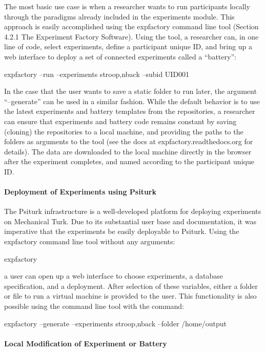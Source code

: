 \documentclass{report}
\begin{document}
The most basic use case is when a researcher wants to run participants
locally through the paradigms already included in the experiments
module. This approach is easily accomplished using the expfactory
command line tool (Section 4.2.1 The Experiment Factory Software). Using
the tool, a researcher can, in one line of code, select experiments,
define a participant unique ID, and bring up a web interface to deploy a
set of connected experiments called a ``battery'':

expfactory --run --experiments stroop,nback --subid UID001

In the case that the user wants to save a static folder to run later,
the argument ``--generate'' can be used in a similar fashion. While the
default behavior is to use the latest experiments and battery templates
from the repositories, a researcher can ensure that experiments and
battery code remains constant by saving (cloning) the repositories to a
local machine, and providing the paths to the folders as arguments to
the tool (see the docs at expfactory.readthedocs.org for details). The
data are downloaded to the local machine directly in the browser after
the experiment completes, and named according to the participant unique
ID.

\paragraph{Deployment of Experiments using Psiturk}

The Psiturk infrastructure is a well-developed platform for deploying
experiments on Mechanical Turk. Due to its substantial user base and
documentation, it was imperative that the experiments be easily
deployable to Psiturk. Using the expfactory command line tool without
any arguments:

expfactory

a user can open up a web interface to choose experiments, a database
specification, and a deployment. After selection of these variables,
either a folder or file to run a virtual machine is provided to the
user. This functionality is also possible using the command line tool
with the command:

expfactory --generate --experiments stroop,nback --folder /home/output

\paragraph{Local Modification of Experiment or Battery}
\end{document}
